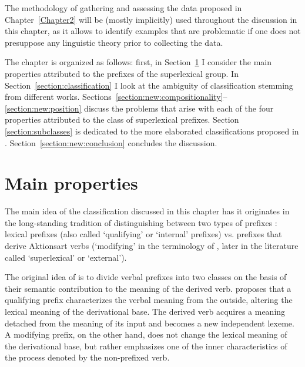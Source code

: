  The methodology of gathering and assessing the data proposed in Chapter~\ref{Chapter2} will be (mostly implicitly) used throughout the discussion in this chapter, as it allows to identify examples that are problematic if one does not presuppose any linguistic theory prior to collecting the data.

The chapter is organized as follows: first, in Section~\ref{section:properties} I consider the main properties attributed to the prefixes of the superlexical group. In Section~\ref{section:classification} I look at the ambiguity of classification stemming from different works. Sections~\ref{section:new:compositionality}--\ref{section:new:position} discuss the problems that arise with each of the four properties attributed to the class of superlexical prefixes. Section \ref{section:subclasses} is dedicated to the more elaborated classifications proposed in \citet{Tatevosov:07,Tatevosov:09}. Section~\ref{section:new:conclusion} concludes the discussion.
\section{Main properties}\label{section:properties}
The main idea of the classification discussed in this chapter has it originates in the long-standing tradition of distinguishing between two types of prefixes \citep{Isachenko:60, Forsyth:70, Townsend:75}: lexical prefixes (also called `qualifying' or `internal' prefixes) vs. prefixes that derive Aktionsart verbs (`modifying' in the terminology of \citeauthor{Isachenko:60}, later in the literature called `superlexical' or `external').

The original idea of \citet[222--224]{Isachenko:60} is to divide verbal prefixes into two classes on the basis of their semantic contribution to the meaning of the derived verb. \citeauthor{Isachenko:60} proposes that a qualifying prefix characterizes the verbal meaning from the outside, altering the lexical meaning of the derivational base. The derived verb acquires a meaning detached from the meaning of its input and becomes a new independent lexeme. A modifying prefix, on the other hand, does not change the lexical meaning of the derivational base, but rather emphasizes one of the inner characteristics of the process denoted by the non-prefixed verb.

